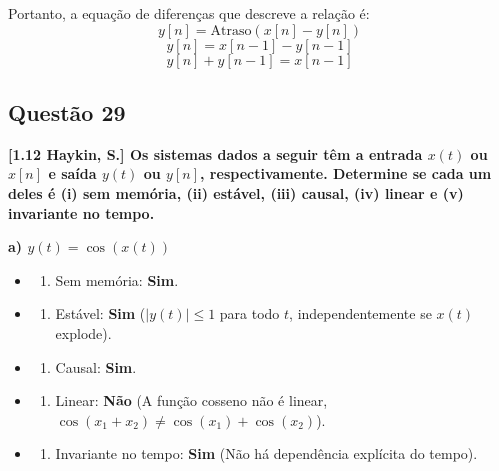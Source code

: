 Portanto, a equação de diferenças que descreve a relação é:
\[y[n] = \text{Atraso}(x[n] - y[n])\]
\[y[n] = x[n-1] - y[n-1]\]
\[y[n] + y[n-1] = x[n-1]\]

\subsection{Questão 29}\label{questuxe3o-29}

\textbf{{[}1.12 Haykin, S.{]} Os sistemas dados a seguir têm a entrada \(x(t)\) ou \(x[n]\) e saída \(y(t)\) ou \(y[n]\), respectivamente. Determine se cada um deles é (i) sem memória, (ii) estável, (iii) causal, (iv) linear e (v) invariante no tempo.}

\textbf{a) \(y(t) = \cos(x(t))\)}

\begin{itemize}
\tightlist
\item
  \begin{enumerate}
  \def\labelenumi{(\roman{enumi})}
  \tightlist
  \item
    Sem memória: \textbf{Sim}.
  \end{enumerate}
\item
  \begin{enumerate}
  \def\labelenumi{(\roman{enumi})}
  \setcounter{enumi}{1}
  \tightlist
  \item
    Estável: \textbf{Sim} (\(|y(t)| \le 1\) para todo \(t\), independentemente se \(x(t)\) explode).
  \end{enumerate}
\item
  \begin{enumerate}
  \def\labelenumi{(\roman{enumi})}
  \setcounter{enumi}{2}
  \tightlist
  \item
    Causal: \textbf{Sim}.
  \end{enumerate}
\item
  \begin{enumerate}
  \def\labelenumi{(\roman{enumi})}
  \setcounter{enumi}{3}
  \tightlist
  \item
    Linear: \textbf{Não} (A função cosseno não é linear, \(\cos(x_1 + x_2) \neq \cos(x_1) + \cos(x_2)\)).
  \end{enumerate}
\item
  \begin{enumerate}
  \def\labelenumi{(\alph{enumi})}
  \setcounter{enumi}{21}
  \tightlist
  \item
    Invariante no tempo: \textbf{Sim} (Não há dependência explícita do tempo).
  \end{enumerate}
\end{itemize}

